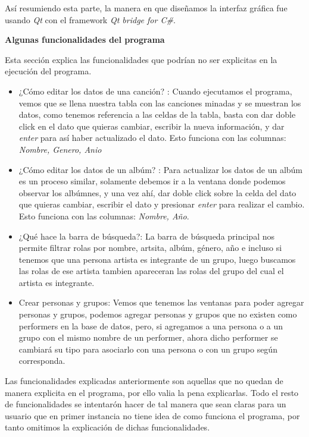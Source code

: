 \documentclass[10pt,letterpaper]{report}
\begin{document}
\vspace{0.2cm}
\noindent Así resumiendo esta parte, la manera en que diseñamos la interfaz gráfica fue usando \textit{Qt} con el framework \textit{Qt bridge for C\#}.

\vspace{0.5cm}

\noindent \textbf{Algunas funcionalidades del programa}

\noindent Esta sección explica las funcionalidades que podrían no ser explicitas en la ejecución del programa.

\begin{itemize}
\item [-] ¿Cómo editar los datos de una canción? : Cuando ejecutamos el programa, vemos que se llena nuestra tabla con las canciones minadas y se muestran los datos, como tenemos referencia a las celdas de la tabla, basta con dar doble click en el dato que quieras cambiar, escribir la nueva información, y dar \textit{enter} para así haber actualizado el dato. Esto funciona con las columnas: \textit{Nombre, Genero, Anio} 

\item [-] ¿Cómo editar los datos de un albúm? : Para actualizar los datos de un albúm es un proceso similar, solamente debemos ir a la ventana donde podemos observar los albúmnes, y una vez ahí, dar doble click sobre la celda del dato que quieras cambiar, escribir el dato y presionar \textit{enter} para realizar el cambio. Esto funciona con las columnas: \textit{Nombre, Año}.

\item [-] ¿Qué hace la barra de búsqueda?: La barra de búsqueda principal nos permite filtrar rolas por nombre, artsita, albúm, género, año e incluso si tenemos que una persona artista es integrante de un grupo, luego buscamos las rolas de ese artista tambien apareceran las rolas del grupo del cual el artista es integrante.

\item [-] Crear personas y grupos: Vemos que tenemos las ventanas para poder agregar personas y grupos, podemos agregar personas y grupos que no existen como performers en la base de datos, pero, si agregamos a una persona o a un grupo con el mismo nombre de un performer, ahora dicho performer se cambiará su tipo para asociarlo con una persona o con un grupo según corresponda.

\end{itemize}

\noindent Las funcionalidades explicadas anteriormente son aquellas que no quedan de manera explicita en el programa, por ello valia la pena explicarlas. Todo el resto de funcionalidades se intentarón hacer de tal manera que sean claras para un usuario que en primer instancia no tiene idea de como funciona el programa, por tanto omitimos la explicación de dichas funcionalidades.
\end{document}
